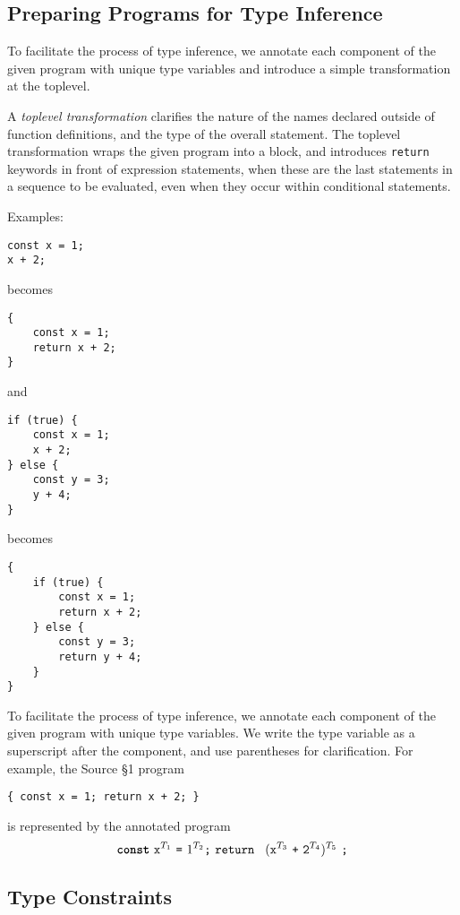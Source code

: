 \subsection{Preparing Programs for Type Inference}

To facilitate the process of type inference, we annotate each component of the given
program with unique type variables and introduce a simple transformation at the toplevel.

A \emph{toplevel transformation} clarifies the nature
of the names declared outside of function definitions,
and the type of the overall statement. The toplevel
transformation wraps the given program into a block, and introduces \lstinline{return}
keywords in front of expression statements, when these are the last statements in a
sequence to be evaluated, even when they occur within conditional statements.

Examples:

\begin{lstlisting}
const x = 1;
x + 2; 
\end{lstlisting}
becomes
\begin{lstlisting}
{
    const x = 1;
    return x + 2;
}    
\end{lstlisting}
and
\begin{lstlisting}
if (true) {
    const x = 1;    
    x + 2;
} else {
    const y = 3;
    y + 4;
}
\end{lstlisting}
becomes
\begin{lstlisting}
{
    if (true) {
        const x = 1;    
        return x + 2;
    } else {
        const y = 3;
        return y + 4;
    }
}
\end{lstlisting}

To facilitate the process of type inference, we annotate each component of the given
program with unique type variables. We write the type variable as a superscript after
the component, and use parentheses for clarification. For example, the Source \S 1
program
\begin{lstlisting}
{ const x = 1; return x + 2; }
\end{lstlisting}
is represented by the annotated program
\[ 
\Const\ \texttt{x}^{T_1}\ \texttt{=}\ 1^{T_2}\texttt{;}\ 
\texttt{return }\ (\texttt{x}^{T_3} \ \texttt{+} \ \texttt{2}^{T_4})^{T_5} \ \texttt{;}
\]

\subsection{Type Constraints}

